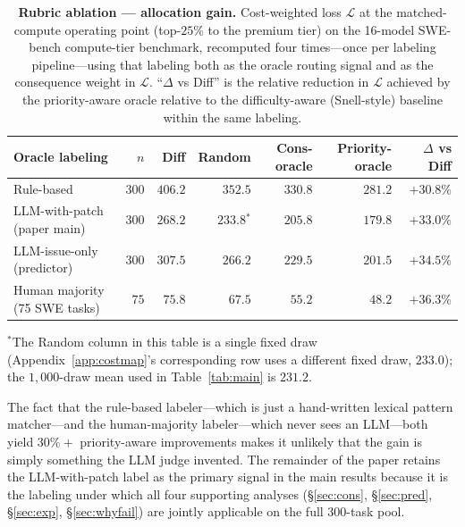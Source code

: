 \documentclass{article}
\begin{document}
\begin{table}[h]
\centering
\caption{\textbf{Rubric ablation — allocation gain.} Cost-weighted loss
$\mathcal{L}$ at the matched-compute operating point (top-$25\%$ to
the premium tier) on the 16-model SWE-bench compute-tier benchmark,
recomputed four times---once per labeling pipeline---using that
labeling both as the oracle routing signal and as the consequence
weight in $\mathcal{L}$. ``$\Delta$ vs Diff'' is the relative
reduction in $\mathcal{L}$ achieved by the priority-aware oracle
relative to the difficulty-aware (Snell-style) baseline within the
same labeling.}
\label{tab:abl-gain}
\small
\begin{tabular}{lrrrrrr}
\toprule
Oracle labeling & $n$ & Diff & Random & Cons-oracle & Priority-oracle & $\Delta$ vs Diff \\
\midrule
Rule-based                                & $300$ & $406.2$ & $352.5$ & $330.8$ & $\mathbf{281.2}$ & $+30.8\%$ \\
LLM-with-patch (paper main)        & $300$ & $268.2$ & $233.8$$^{*}$ & $205.8$ & $\mathbf{179.8}$ & $+33.0\%$ \\
LLM-issue-only (predictor)         & $300$ & $307.5$ & $266.2$ & $229.5$ & $\mathbf{201.5}$ & $+34.5\%$ \\
Human majority (75 SWE tasks)      & $\phantom{0}75$  & $\phantom{0}75.8$  & $\phantom{0}67.5$  & $\phantom{0}55.2$  & $\phantom{00}\mathbf{48.2}$  & $+36.3\%$ \\
\bottomrule
\end{tabular}

\vspace{2pt}\par{\footnotesize $^{*}$The Random column in this table is a single fixed draw (Appendix~\ref{app:costmap}'s corresponding row uses a different fixed draw, $233.0$); the $1{,}000$-draw mean used in Table~\ref{tab:main} is $231.2$.}
\end{table}

The fact that the rule-based labeler---which is just a hand-written
lexical pattern matcher---and the human-majority labeler---which never
sees an LLM---both yield $30\%+$ priority-aware improvements makes it
unlikely that the gain is simply something the LLM judge invented. The
remainder of the paper retains the LLM-with-patch label as the
primary signal in the main results because it is the labeling under
which all four supporting analyses
(\S\ref{sec:cons}, \S\ref{sec:pred}, \S\ref{sec:exp}, \S\ref{sec:whyfail})
are jointly applicable on the full 300-task pool.
\end{document}
